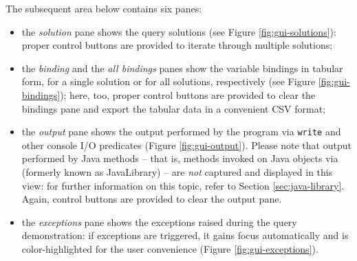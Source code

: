 The subsequent area below contains six panes:
%
\begin{itemize}
\item the \textit{solution} pane shows the query solutions (see Figure \ref{fig:gui-solutions}): proper control buttons are provided to iterate through multiple solutions;


\item the \textit{binding} and the \textit{all bindings} panes show the variable bindings in tabular form, for a single solution or for all solutions, respectively (see Figure \ref{fig:gui-bindings}); here, too, proper control buttons are provided to clear the bindings pane and export the tabular data in a convenient CSV format;

\item the \textit{output} pane shows the output performed by the program via \texttt{write} and other console I/O predicates (Figure \ref{fig:gui-output}).
    Please note that output performed by Java methods -- that is, methods invoked on Java objects via  (formerly known as JavaLibrary) -- are \textit{not} captured and displayed in this view: for further information on this topic, refer to Section \ref{sec:java-library}.
    Again, control buttons are provided to clear the output pane.

\item the \textit{exceptions} pane shows the exceptions raised during the query demonstration: if exceptions are triggered, it gains focus automatically and is color-highlighted for the user convenience (Figure \ref{fig:gui-exceptions}).
\end{itemize}


